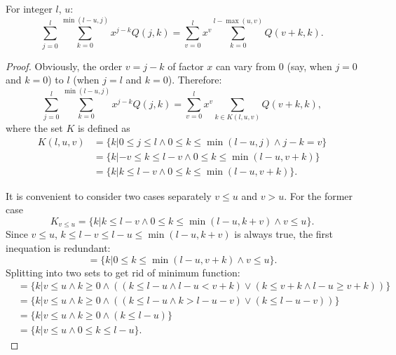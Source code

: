 \begin{lemma}
\label{lmm:formalism:transformations:sum-rearrangement}
For integer $l$, $u$:
\[
	\sum_{j=0}^l \sum_{k=0}^{\min(l-u,j)} x^{j-k} Q(j, k)
	= \sum_{v=0}^l x^v \sum_{k=0}^{l-\max(u,v)} Q(v + k, k).
\]
\end{lemma}
\begin{proof}
Obviously, the order $v = j - k$ of factor $x$ can vary from $0$ (say, when $j=0$ and $k=0$) to $l$ (when $j=l$ and $k=0$).
Therefore:
\[
	\sum_{j=0}^l \sum_{k=0}^{\min(l-u,j)} x^{j-k} Q(j, k)
	= \sum_{v=0}^l x^v \sum_{k \in K(l, u, v)} Q(v + k, k),
\]
where the set $K$ is defined as
\begin{equation*}
\begin{split}
	K(l, u, v)
	& = \{k |
		0 \le j \le l
		\wedge 0 \le k \le \min(l - u, j)
		\wedge j - k = v
	\} \\
	& = \{k |
		-v \le k \le l - v
		\wedge 0 \le k \le \min(l - u, v + k)
	\} \\
	& = \{k |
		k \le l - v
		\wedge 0 \le k \le \min(l - u, v + k)
	\}.
\end{split}
\end{equation*}

It is convenient to consider two cases separately $v \le u$ and $v > u$.
For the former case
\[
	K_{v \le u}
	= \{k |
		k \le l - v
		\wedge 0 \le k \le \min(l - u, k + v)
		\wedge v \le u
	\}.
\]
Since $v \le u$, $k \le l - v \le l - u \le \min(l - u, k + v)$ is always true,
the first inequation is redundant:
\[
	= \{k |
		0 \le k \le \min(l - u, v + k)
		\wedge v \le u
	\}.
\]
Splitting into two sets to get rid of minimum function:
\begin{equation*}
\begin{split}
	& = \{k |
		v \le u \wedge k \ge 0
		\wedge
		(
			(k \le l - u \wedge l - u < v + k)
			\vee
			(k \le v + k \wedge l - u \ge v + k)
		)
	\} \\
	& = \{k |
		v \le u \wedge k \ge 0
		\wedge
		(
			(k \le l - u \wedge k > l - u - v)
			\vee
			(k \le l - u - v)
		)
	\} \\
	& = \{k |
		v \le u \wedge k \ge 0
		\wedge
		(k \le l - u)
	\} \\
	& = \{k | v \le u \wedge 0 \le k \le l - u \}.
\end{split}
\end{equation*}


\end{proof}
